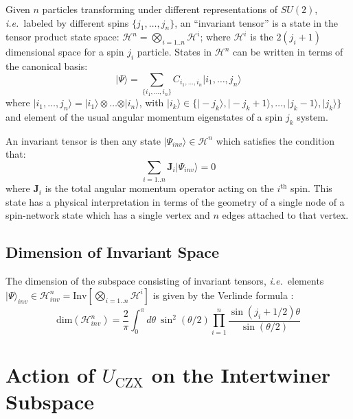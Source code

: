 \documentclass[preprint]{SciPost}
\newcommand{\ie}{\textit{i.e.}~}
\newcommand{\mc}[1]{\mathcal{#1}}
\newcommand{\vect}[1]{\boldsymbol{#1}}
\newcommand{\ket}[1]{\vert #1 \rangle}
\theoremstyle{plain} %
\begin{document}
Given $ n $ particles transforming under different representations of $ SU(2) $, \ie labeled by different spins $ \{j_1,\ldots,j_n \} $, an ``invariant tensor'' is a state in the tensor product state space: $ \mc{H}^n = \underset{i=1..n}{\bigotimes} \mc{H}^i $; where $ \mc{H}^i $ is the $ 2(j_i+1) $ dimensional space for a spin $ j_i $ particle. States in $ \mc{H}^n $ can be written in terms of the canonical basis:
\begin{equation}\label{eqn:n-body-state}
	\ket{\Psi} = \sum_{\{i_1,\ldots,i_n\}} C_{i_1,\ldots,i_n} \ket{i_1,\ldots,j_n}
\end{equation}
where $ \ket{i_1,\ldots,j_n} = \ket{i_1} \otimes \ldots \otimes \ket{i_n} $, with $ \ket{i_k} \in \{\ket{-j_k}, \ket{-j_k + 1}, \ldots, \ket{j_k - 1}, \ket{j_k}\} $ and element of the usual angular momentum eigenstates of a spin $ j_k $ system.

An invariant tensor is then any state $ \ket{\Psi_{inv}} \in \mc{H}^n $ which satisfies the condition \cite[App. A]{Li2017Invariant} that:
\begin{equation}\label{eqn:quantum-closure-condition}
	\sum_{i=1..n} \vect{J}_i \ket{\Psi_{inv}} = 0
\end{equation}
where $ \vect{J}_i $ is the total angular momentum operator acting on the $ i^\text{th} $ spin. This state has a physical interpretation in terms of the geometry of a single node of a spin-network state which has a single vertex and $ n $ edges attached to that vertex.

\subsection*{Dimension of Invariant Space}

The dimension of the subspace consisting of invariant tensors, \ie elements $ \ket{\Psi}_{inv} \in \mc{H}^n_{inv} = \text{Inv}\left[\underset{i=1..n}{\bigotimes} \mc{H}^i\right] $ is given by the Verlinde formula \cite{Verlinde1988Fusion}:
\begin{equation}\label{eqn:verlinde-formulat}
	\text{dim} (\mc{H}^n_{inv}) = \frac{2}{\pi} \int_{0}^{\pi} d\theta~\sin^2(\theta/2) \prod_{i=1}^{n} \frac{\sin(j_i + 1/2)\theta}{\sin(\theta/2)}
\end{equation}

\nolinenumbers



\section{Action of $U_{\mathrm{CZX}}$ on the Intertwiner Subspace}\label{subsec:czx-intertwiner}
\end{document}
